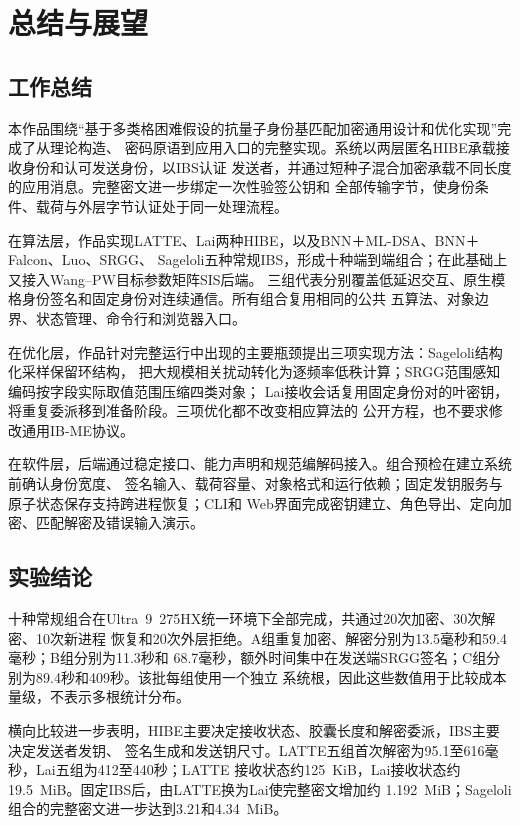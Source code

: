 \chapter{总结与展望}

\section{工作总结}

本作品围绕“基于多类格困难假设的抗量子身份基匹配加密通用设计和优化实现”完成了从理论构造、
密码原语到应用入口的完整实现。系统以两层匿名HIBE承载接收身份和认可发送身份，以IBS认证
发送者，并通过短种子混合加密承载不同长度的应用消息。完整密文进一步绑定一次性验签公钥和
全部传输字节，使身份条件、载荷与外层字节认证处于同一处理流程。

在算法层，作品实现LATTE、Lai两种HIBE，以及BNN＋ML-DSA、BNN＋Falcon、Luo、SRGG、
Sageloli五种常规IBS，形成十种端到端组合；在此基础上又接入Wang--PW目标参数矩阵SIS后端。
三组代表分别覆盖低延迟交互、原生模格身份签名和固定身份对连续通信。所有组合复用相同的公共
五算法、对象边界、状态管理、命令行和浏览器入口。

在优化层，作品针对完整运行中出现的主要瓶颈提出三项实现方法：Sageloli结构化采样保留环结构，
把大规模相关扰动转化为逐频率低秩计算；SRGG范围感知编码按字段实际取值范围压缩四类对象；
Lai接收会话复用固定身份对的叶密钥，将重复委派移到准备阶段。三项优化都不改变相应算法的
公开方程，也不要求修改通用IB-ME协议。

在软件层，后端通过稳定接口、能力声明和规范编解码接入。组合预检在建立系统前确认身份宽度、
签名输入、载荷容量、对象格式和运行依赖；固定发钥服务与原子状态保存支持跨进程恢复；CLI和
Web界面完成密钥建立、角色导出、定向加密、匹配解密及错误输入演示。

\section{实验结论}

十种常规组合在Ultra~9~275HX统一环境下全部完成，共通过20次加密、30次解密、10次新进程
恢复和20次外层拒绝。A组重复加密、解密分别为13.5毫秒和59.4毫秒；B组分别为11.3秒和
68.7毫秒，额外时间集中在发送端SRGG签名；C组分别为89.4秒和409秒。该批每组使用一个独立
系统根，因此这些数值用于比较成本量级，不表示多根统计分布。

横向比较进一步表明，HIBE主要决定接收状态、胶囊长度和解密委派，IBS主要决定发送者发钥、
签名生成和发送钥尺寸。LATTE五组首次解密为95.1至616毫秒，Lai五组为412至440秒；LATTE
接收状态约125~KiB，Lai接收状态约19.5~MiB。固定IBS后，由LATTE换为Lai使完整密文增加约
1.192~MiB；Sageloli组合的完整密文进一步达到3.21和4.34~MiB。

